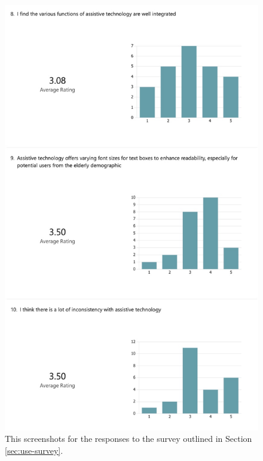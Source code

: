 \documentclass{l4proj}
\begin{document}
\begin{appendices}
\begin{figure}[H]
    \centering
    \includegraphics[width=0.75\linewidth]{dissertation/images/use-survey-3.jpeg}    
    \caption{This screenshots for the responses to the survey outlined in Section \ref{sec:use-survey}.}
    \label{fig:use-survey-3} 
\end{figure}


\end{appendices}
\end{document}
